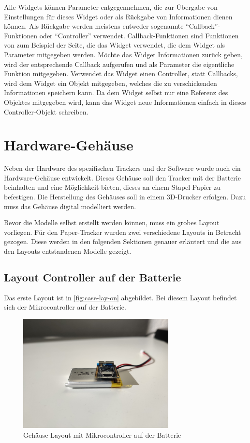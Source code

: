 Alle Widgets können Parameter entgegennehmen, die zur Übergabe von Einstellungen für dieses Widget oder als Rückgabe
von Informationen dienen können.
Als Rückgabe werden meistens entweder sogenannte \enquote{Callback}-Funktionen oder \enquote{Controller} verwendet.
Callback-Funktionen sind Funktionen von zum Beispiel der Seite, die das Widget verwendet, die dem Widget als Parameter
mitgegeben werden.
Möchte das Widget Informationen zurück geben, wird der entsprechende Callback aufgerufen und als Parameter die eigentliche
Funktion mitgegeben.
Verwendet das Widget einen Controller, statt Callbacks, wird dem Widget ein Objekt mitgegeben, welches die zu verschickenden
Informationen speichern kann.
Da dem Widget selbst nur eine Referenz des Objektes mitgegeben wird, kann das Widget neue Informationen einfach in dieses
Controller-Objekt schreiben.

\section{Hardware-Gehäuse}

Neben der Hardware des spezifischen Trackers und der Software wurde auch ein Hardware-Gehäuse entwickelt.
Dieses Gehäuse soll den Tracker mit der Batterie beinhalten und eine Möglichkeit bieten, dieses an einem Stapel Papier zu befestigen.
Die Herstellung des Gehäuses soll in einem 3D-Drucker erfolgen.
Dazu muss das Gehäuse digital modelliert werden.

Bevor die Modelle selbst erstellt werden können, muss ein grobes Layout vorliegen.
Für den Paper-Tracker wurden zwei verschiedene Layouts in Betracht gezogen.
Diese werden in den folgenden Sektionen genauer erläutert und die aus den Layouts entstandenen Modelle gezeigt.

\subsection{Layout Controller auf der Batterie}
Das erste Layout ist in \autoref{fig:case-lay-on} abgebildet.
Bei diesem Layout befindet sich der Mikrocontroller auf der Batterie.

\begin{figure}[htbp]
	\includegraphics[width=300px]{images/case/pico_on_battery.jpg}
	\centering
	\caption{Gehäuse-Layout mit Mikrocontroller auf der Batterie}
	\label{fig:case-lay-on}
\end{figure}

